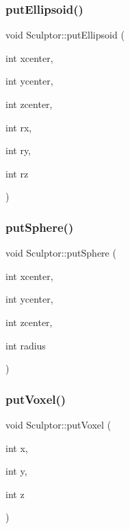 \mbox{\label{class_sculptor_a093615b0c2b9b3a17a56300b9b939f39}} 
\subsubsection{\texorpdfstring{putEllipsoid()}{putEllipsoid()}}
{\footnotesize\ttfamily void Sculptor\+::put\+Ellipsoid (\begin{DoxyParamCaption}\item[{int}]{xcenter,  }\item[{int}]{ycenter,  }\item[{int}]{zcenter,  }\item[{int}]{rx,  }\item[{int}]{ry,  }\item[{int}]{rz }\end{DoxyParamCaption})}

\mbox{\label{class_sculptor_a794a2b6ee8fc8098fd6150cb46101fc6}} 
\subsubsection{\texorpdfstring{putSphere()}{putSphere()}}
{\footnotesize\ttfamily void Sculptor\+::put\+Sphere (\begin{DoxyParamCaption}\item[{int}]{xcenter,  }\item[{int}]{ycenter,  }\item[{int}]{zcenter,  }\item[{int}]{radius }\end{DoxyParamCaption})}

\mbox{\label{class_sculptor_a4bdea3048b419d58e93074060eaa7b52}} 
\subsubsection{\texorpdfstring{putVoxel()}{putVoxel()}}
{\footnotesize\ttfamily void Sculptor\+::put\+Voxel (\begin{DoxyParamCaption}\item[{int}]{x,  }\item[{int}]{y,  }\item[{int}]{z }\end{DoxyParamCaption})}

